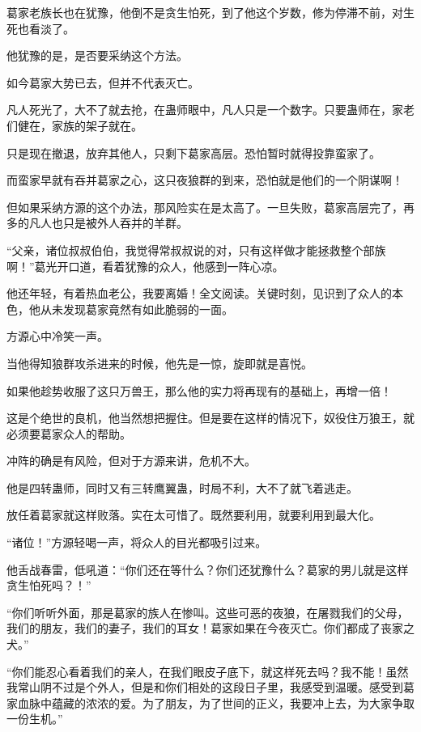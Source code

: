 
\begin{this_body}



葛家老族长也在犹豫，他倒不是贪生怕死，到了他这个岁数，修为停滞不前，对生死也看淡了。

他犹豫的是，是否要采纳这个方法。

如今葛家大势已去，但并不代表灭亡。

凡人死光了，大不了就去抢，在蛊师眼中，凡人只是一个数字。只要蛊师在，家老们健在，家族的架子就在。

只是现在撤退，放弃其他人，只剩下葛家高层。恐怕暂时就得投靠蛮家了。

而蛮家早就有吞并葛家之心，这只夜狼群的到来，恐怕就是他们的一个阴谋啊！

但如果采纳方源的这个办法，那风险实在是太高了。一旦失败，葛家高层完了，再多的凡人也只是被外人吞并的羊群。

“父亲，诸位叔叔伯伯，我觉得常叔叔说的对，只有这样做才能拯救整个部族啊！”葛光开口道，看着犹豫的众人，他感到一阵心凉。

他还年轻，有着热血老公，我要离婚！全文阅读。关键时刻，见识到了众人的本色，他从未发现葛家竟然有如此脆弱的一面。

方源心中冷笑一声。

当他得知狼群攻杀进来的时候，他先是一惊，旋即就是喜悦。

如果他趁势收服了这只万兽王，那么他的实力将再现有的基础上，再增一倍！

这是个绝世的良机，他当然想把握住。但是要在这样的情况下，奴役住万狼王，就必须要葛家众人的帮助。

冲阵的确是有风险，但对于方源来讲，危机不大。

他是四转蛊师，同时又有三转鹰翼蛊，时局不利，大不了就飞着逃走。

放任着葛家就这样败落。实在太可惜了。既然要利用，就要利用到最大化。

“诸位！”方源轻喝一声，将众人的目光都吸引过来。

他舌战春雷，低吼道：“你们还在等什么？你们还犹豫什么？葛家的男儿就是这样贪生怕死吗？！”

“你们听听外面，那是葛家的族人在惨叫。这些可恶的夜狼，在屠戮我们的父母，我们的朋友，我们的妻子，我们的耳女！葛家如果在今夜灭亡。你们都成了丧家之犬。”

“你们能忍心看着我们的亲人，在我们眼皮子底下，就这样死去吗？我不能！虽然我常山阴不过是个外人，但是和你们相处的这段日子里，我感受到温暖。感受到葛家血脉中蕴藏的浓浓的爱。为了朋友，为了世间的正义，我要冲上去，为大家争取一份生机。”


\end{this_body}
